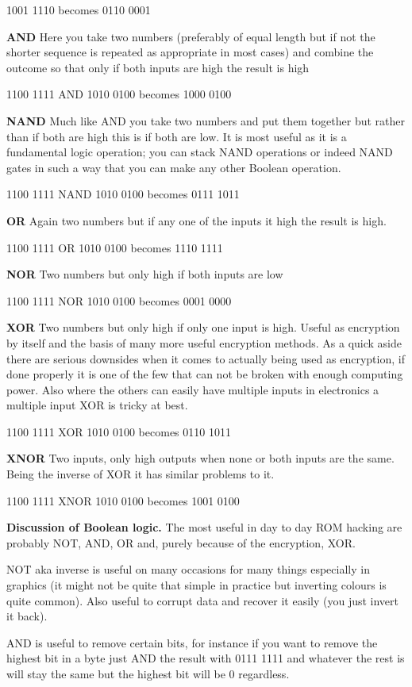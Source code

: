 \documentclass[
]{book}
\begin{document}
1001 1110 becomes 0110 0001

\textbf{AND} Here you take two numbers (preferably of equal length but if not the shorter sequence is repeated as appropriate in most cases) and combine the outcome so that only if both inputs are high the result is high

1100 1111 AND 1010 0100 becomes 1000 0100

\textbf{NAND} Much like AND you take two numbers and put them together but rather than if both are high this is if both are low. It is most useful as it is a fundamental logic operation; you can stack NAND operations or indeed NAND gates in such a way that you can make any other Boolean operation.

1100 1111 NAND 1010 0100 becomes 0111 1011

\textbf{OR} Again two numbers but if any one of the inputs it high the result is high.

1100 1111 OR 1010 0100 becomes 1110 1111

\textbf{NOR} Two numbers but only high if both inputs are low

1100 1111 NOR 1010 0100 becomes 0001 0000

\textbf{XOR} Two numbers but only high if only one input is high. Useful as encryption by itself and the basis of many more useful encryption methods. As a quick aside there are serious downsides when it comes to actually being used as encryption, if done properly it is one of the few that can not be broken with enough computing power. Also where the others can easily have multiple inputs in electronics a multiple input XOR is tricky at best.

1100 1111 XOR 1010 0100 becomes 0110 1011

\textbf{XNOR} Two inputs, only high outputs when none or both inputs are the same. Being the inverse of XOR it has similar problems to it.

1100 1111 XNOR 1010 0100 becomes 1001 0100

\textbf{Discussion of Boolean logic.} The most useful in day to day ROM hacking are probably NOT, AND, OR and, purely because of the encryption, XOR.

NOT aka inverse is useful on many occasions for many things especially in graphics (it might not be quite that simple in practice but inverting colours is quite common). Also useful to corrupt data and recover it easily (you just invert it back).

AND is useful to remove certain bits, for instance if you want to remove the highest bit in a byte just AND the result with 0111 1111 and whatever the rest is will stay the same but the highest bit will be 0 regardless.
\end{document}
